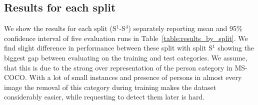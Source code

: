 \documentclass{article}
\newcommand{\coco}{MS-COCO\xspace}
\begin{document}
\subsection{Results for each split}

We show the results for each split (S$^1$-S$^4$) separately reporting mean and 95\% confidence interval of five evaluation runs in Table~\ref{table:results_by_split}. We find slight difference in performance between these split with split S$^1$ showing the biggest gap between evaluating on the training and test categories. We assume, that this is due to the strong over representation of the person category in \coco \cite{Lin2014}. With a lot of small instances and presence of persons in almost every image the removal of this category during training makes the dataset considerably easier, while requesting to detect them later is hard.
\end{document}

